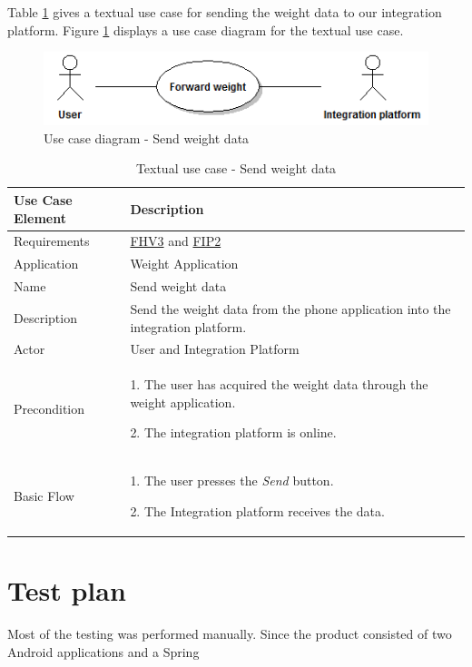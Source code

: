 Table \ref{table:use-case-send-weight-data} gives a textual use case for sending the weight data to our integration platform.
Figure \ref{figure:use-case-diagram-send-weight} displays a use case diagram for the textual use case.

\begin{figure}[H]
\centering
\includegraphics[scale=0.75]{../Figures/use-case-diagram-send-weight.png}
\caption{Use case diagram - Send weight data}
\label{figure:use-case-diagram-send-weight}
\end{figure}

\begin{table}[H]
\begin{center}
\begin{tabular}{ l | p{10cm} }
  \hline
  \textbf{Use Case Element} & \textbf{Description} \\ \hline\hline
  Requirements & \hyperref[table:reqweight]{FHV3} and \hyperref[table:reqip]{FIP2}\\ \hline
  Application & Weight Application \\ \hline
  Name & Send weight data \\ \hline
  Description & Send the weight data from the phone application into the integration platform. \\ \hline
  Actor & User and Integration Platform \\ \hline
  Precondition &
    \par 1. The user has acquired the weight data through the weight application.
    \par 2. The integration platform is online.
  \\ \hline
  Basic Flow & 
  	\par 1. The user presses the \textit{Send} button.
  	\par 2. The Integration platform receives the data.
  \\ \hline
\end{tabular}
\end{center}
\caption{Textual use case - Send weight data}
\label{table:use-case-send-weight-data}
\end{table}



\section{Test plan}

Most of the testing was performed manually.
Since the product consisted of two Android applications and a Spring
